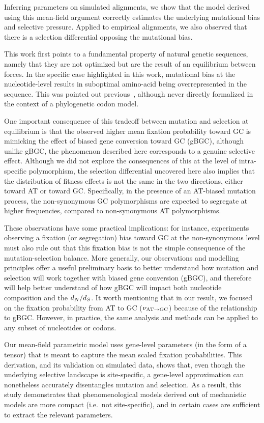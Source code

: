 Inferring parameters on simulated alignments, we show that the model derived using this mean-field argument correctly estimates the underlying mutational bias and selective pressure.
Applied to empirical alignments, we also observed that there is a selection differential opposing the mutational bias.

This work first points to a fundamental property of natural genetic sequences, namely that they are not optimized but are the result of an equilibrium between forces.
In the specific case highlighted in this work, mutational bias at the nucleotide-level results in suboptimal amino-acid being overrepresented in the sequence.
This was pointed out previous~\citep{Singer2000}, although never directly formalized in the context of a phylogenetic codon model.

One important consequence of this tradeoff between mutation and selection at equilibrium is that the observed higher mean fixation probability toward GC is mimicking the effect of biased gene conversion toward GC (gBGC), although unlike gBGC, the phenomenon described here corresponds to a genuine selective effect.
Although we did not explore the consequences of this at the level of intra-specific polymorphism, the selection differential uncovered here also implies that the distribution of fitness effects is not the same in the two directions, either toward AT or toward GC.
Specifically, in the presence of an AT-biased mutation process, the non-synonymous GC polymorphisms are expected to segregate at higher frequencies, compared to non-synonymous AT polymorphisms.

These observations have some practical implications: for instance, experiments observing a fixation (or segregation) bias toward GC at the non-synonymous level must also rule out that this fixation bias is not the simple consequence of the mutation-selection balance.
More generally, our observations and modelling principles offer a useful preliminary basis to better understand how mutation and selection will work together with biased gene conversion (gBGC), and therefore will help better understand of how gBGC will impact both nucleotide composition and the $d_N / d_S$.
It worth mentioning that in our result, we focused on the fixation probability from AT to GC ($\nu_{\text{AT} \rightarrow \text{GC}}$) because of the relationship to gBGC.
However, in practice, the same analysis and methods can be applied to any subset of nucleotides or codons.

Our mean-field parametric model uses gene-level parameters (in the form of a tensor) that is meant to capture the mean scaled fixation probabilities.
This derivation, and its validation on simulated data, shows that, even though the underlying selective landscape is site-specific, a gene-level approximation can nonetheless accurately disentangles mutation and selection.
As a result, this study demonstrates that phenomenological models derived out of mechanistic models are more compact (i.e.~not site-specific), and in certain cases are sufficient to extract the relevant parameters.

